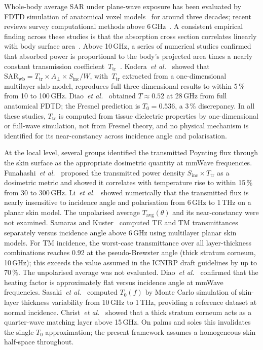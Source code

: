 \documentclass[11pt,a4paper]{article}
\theoremstyle{definition}      %
\newcommand{\Sinc}{S_{\mathrm{inc}}}
\newcommand{\Tavg}{T_{\mathrm{avg}}}
\newcommand{\Aperp}{A_{\perp}}
\newcommand{\SARwb}{\mathrm{SAR}_{\mathrm{wb}}}
\begin{document}
Whole-body average SAR under plane-wave exposure has been evaluated by
FDTD simulation of anatomical voxel
models~\cite{Dimbylow2002,Christ2006,Hirata2007corr} for around three
decades; recent reviews survey computational methods above
6\,GHz~\cite{Hirata2021,Zhadobov2011,Colombi2018}.
A consistent empirical finding across these studies is that the
absorption cross section correlates linearly with body surface
area~\cite{Hirata2007corr,Dimbylow2002}.
Above 10\,GHz, a series of numerical studies confirmed that absorbed
power is proportional to the body's projected area times a nearly
constant transmission
coefficient~$T_{\mathrm{tr}}$~\cite{Kodera2024,Diao2024,Colombi2018}.
Kodera~\textit{et al.}~\cite{Kodera2024} showed that
$\SARwb = T_{\mathrm{tr}} \times \Aperp \times \Sinc / W$,
with~$T_{\mathrm{tr}}$ extracted from a one-dimensional
multilayer slab model, reproduces full three-dimensional results to
within 5\,\% from 10 to 100\,GHz.
Diao~\textit{et al.}~\cite{Diao2024} obtained
$T \approx 0.52$ at 28\,GHz from full anatomical FDTD; the Fresnel
prediction is $T_0 = 0.536$, a 3\,\% discrepancy.
In all these studies, $T_{\mathrm{tr}}$ is computed from tissue
dielectric properties by one-dimensional or full-wave simulation,
not from Fresnel theory, and no physical mechanism is identified for
its near-constancy across incidence angle and polarisation.

At the local level, several groups identified the transmitted Poynting
flux through the skin surface as the appropriate dosimetric quantity
at mmWave frequencies.
Funahashi~\textit{et al.}~\cite{Funahashi2018} proposed the
transmitted power density $\Sinc \times T_{\mathrm{tr}}$ as a
dosimetric metric and showed it correlates with temperature rise to
within 15\,\% from 30 to 300\,GHz.
Li~\textit{et al.}~\cite{Li2019} showed numerically that the
transmitted flux is nearly insensitive to incidence angle and
polarisation from 6\,GHz to 1\,THz on a planar skin model.
The unpolarised average $\Tavg(\theta)$ and its near-constancy were
not examined.
Samaras and Kuster~\cite{Samaras2019} computed TE and TM
transmittances separately versus incidence angle above 6\,GHz using
multilayer planar skin models.
For TM incidence, the worst-case transmittance over all
layer-thickness combinations reaches 0.92 at the pseudo-Brewster
angle (thick stratum corneum, 10\,GHz); this exceeds the value
assumed in the ICNIRP draft guidelines by up to 70\,\%.
The unpolarised average was not evaluated.
Diao~\textit{et al.}~\cite{Diao2021} confirmed that the heating
factor is approximately flat versus incidence angle at mmWave
frequencies.
Sasaki~\textit{et al.}~\cite{Sasaki2017} computed $T_0(f)$ by Monte
Carlo simulation of skin-layer thickness variability from 10\,GHz to
1\,THz, providing a reference dataset at normal incidence.
Christ~\textit{et al.}~\cite{Christ2020a} showed that a thick stratum
corneum acts as a quarter-wave matching layer above 15\,GHz.
On palms and soles this invalidates the single-$T_0$ approximation;
the present framework assumes a homogeneous skin half-space
throughout.
\end{document}
